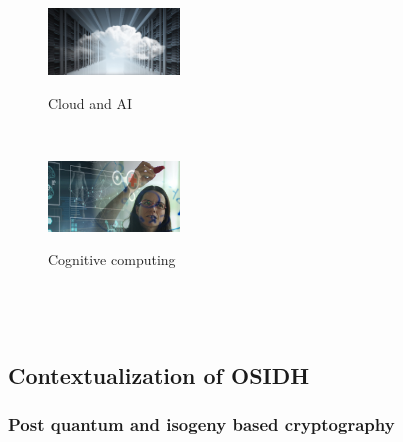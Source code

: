 \documentclass[10pt]{beamer}
\theoremstyle{plain}
\theoremstyle{definition}
\renewcommand{\(}{\left(}
\renewcommand{\)}{\right)}
\begin{document}
\begin{frame}
\begin{columns}[t]
\begin{figure}
\includegraphics[width=3.5cm]
{cloud_and_AI.png} 

Cloud and AI

\vspace{0.1cm}

{\\}

\vspace{0.3cm}

\includegraphics[width=3.5cm]
{cognitive_computing.jpg}

Cognitive computing

\vspace{0.1cm}

{\\}
\end{figure}
\end{columns}

\end{frame}

\subsection{Contextualization of OSIDH}

\subsubsection{Post quantum and isogeny based cryptography}
\end{document}
